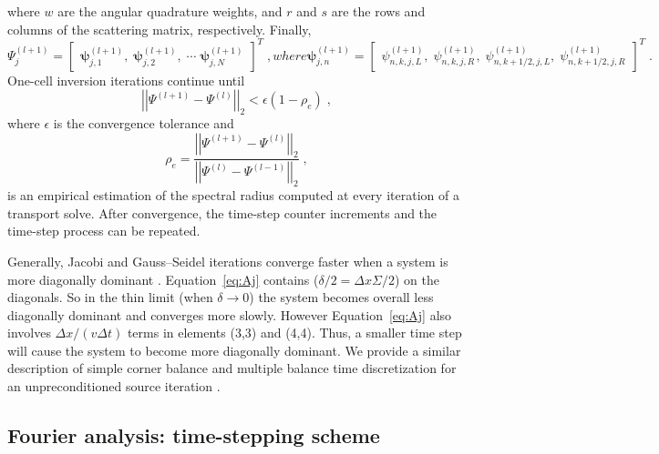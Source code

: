 where $w$ are the angular quadrature weights, and $r$ and $s$ are the rows and columns of the scattering matrix, respectively.
Finally,
\begin{subequations}
\label{eq:x_vec}
\begin{equation}
\Psi^{(l+1)}_j =  \begin{bmatrix}
    \bm{\psi}_{j,1}^{(l+1)}, \;
    \bm{\psi}_{j,2}^{(l+1)}, \;
    \cdots \;
    \bm{\psi}_{j,N}^{(l+1)}
    \end{bmatrix} ^{T} \; ,
\end{equation}
where
\begin{equation} 
\bm{\psi}_{j,n}^{(l+1)} = \begin{bmatrix}
    \psi_{n,k,j,L}^{(l+1)}, \;
    \psi_{n,k,j,R}^{(l+1)}, \;
    \psi_{n,k+1/2,j,L}^{(l+1)}, \;
    \psi_{n,k+1/2,j,R}^{(l+1)}
    \end{bmatrix}^{T} \;.
\end{equation}
\end{subequations}
One-cell inversion iterations continue until
\begin{equation}
    \left|\left|\Psi^{(l+1)}-\Psi^{(l)}\right|\right|_{2} < \epsilon(1-\rho_e) \; ,
\end{equation}
where $\epsilon$ is the convergence tolerance and
\begin{equation}
    \rho_e = \frac{\left|\left|\Psi^{(l+1)}-\Psi^{(l)}\right|\right|_{2}}{\left|\left|\Psi^{(l)}-\Psi^{(l-1)}\right|\right|_{2}} \; ,
\end{equation}
is an empirical estimation of the spectral radius computed at every iteration of a transport solve.
After convergence, the time-step counter increments and the time-step process can be repeated.

Generally, Jacobi and Gauss--Seidel iterations converge faster when a system is more diagonally dominant \cite{isaacson_numerical_1966, golub_matrix_1983}.
Equation~\eqref{eq:Aj} contains ($ \delta/2 = \Delta x\Sigma/2 $) on the diagonals.
So in the thin limit (when $\delta\rightarrow 0$) the system becomes overall less diagonally dominant and converges more slowly.
However Equation~\eqref{eq:Aj} also involves $\Delta x/(v\Delta t)$ terms in elements (3,3) and (4,4).
Thus, a smaller time step will cause the system to become more diagonally dominant.
We provide a similar description of simple corner balance and multiple balance time discretization for an unpreconditioned source iteration \cite{morgan2023oci}.

\subsection{Fourier analysis: time-stepping scheme}
\label{sec:ocifourierdev}

